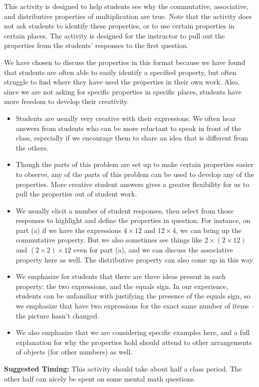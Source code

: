 \documentclass{ximera}
\begin{document}
\newpage
\begin{instructorNotes}
This activity is designed to help students see why the commutative, associative, and distributive properties of multiplication are true.  Note that the activity does not ask students to identify these properties, or to use certain properties in certain places.  The activity is designed for the instructor to pull out the properties from the students' responses to the first question.

We have chosen to discuss the properties in this format because we have found that students are often able to easily identify a specified property, but often struggle to find where they have used the properties in their own work.  Also, since we are not asking for specific properties in specific places, students have more freedom to develop their creativity.

\begin{itemize}
    \item Students are usually very creative with their expressions.  We often hear answers from students who can be more reluctant to speak in front of the class, especially if we encourage them to share an idea that is different from the others.
    \item Though the parts of this problem are set up to make certain properties easier to observe, any of the parts of this problem can be used to develop any of the properties.  More creative student answers gives a greater flexibility for us to pull the properties out of student work.
    \item We usually elicit a number of student responses, then select from those responses to highlight and define the properties in question.  For instance, on part (a) if we have the expressions $4 \times 12$ and $12 \times 4$, we can bring up the commutative property.  But we also sometimes see things like $2 \times (2\times 12)$ and $(2 \times 2) \times 12$ even for part (a), and we can discuss the associative property here as well.  The distributive property can also come up in this way.
    \item We emphasize for students that there are three ideas present in each property: the two expressions, and the equals sign.  In our experience, students can be unfamiliar with justifying the presence of the equals sign, so we emphasize that have two expressions for the exact same number of items -- the picture hasn't changed.
    \item We also emphasize that we are considering specific examples here, and a full explanation for why the properties hold should attend to other arrangements of objects (for other numbers) as well.
\end{itemize}


{\bf Suggested Timing:} This activity should take about half a class period.  The other half can nicely be spent on some mental math questions.
\end{instructorNotes}
\end{document}
